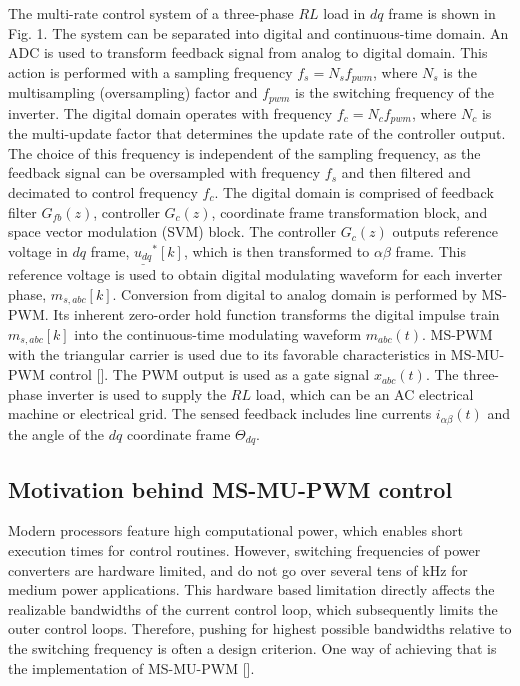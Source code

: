 \documentclass[journal]{IEEEtran}
\begin{document}
The multi-rate control system of a three-phase $RL$ load in $dq$ frame is shown in Fig. 1. The system can be separated into digital and continuous-time domain. An ADC is used to transform feedback signal from analog to digital domain. This action is performed with a sampling frequency $f_s = N_s f_{pwm}$, where $N_s$ is the multisampling (oversampling) factor and $f_{pwm}$ is the switching frequency of the inverter. The digital domain operates with frequency $f_c = N_c f_{pwm}$, where $N_c$ is the multi-update factor that determines the update rate of the controller output. The choice of this frequency is independent of the sampling frequency, as the feedback signal can be oversampled with frequency $f_s$ and then filtered and decimated to control frequency $f_c$. The digital domain is comprised of feedback filter $G_{fb}(z)$, controller $G_c(z)$, coordinate frame transformation block, and space vector modulation (SVM) block. The controller $G_c(z)$ outputs reference voltage in $dq$ frame, $\underline{u_{dq}}^*[k]$, which is then transformed to $\alpha \beta$ frame. This reference voltage is used to obtain digital modulating waveform for each inverter phase, $m_{s,abc}[k]$. Conversion from digital to analog domain is performed by MS-PWM. Its inherent zero-order hold function transforms the digital impulse train $m_{s,abc}[k]$ into the continuous-time modulating waveform $m_{abc}(t)$. MS-PWM with the triangular carrier is used due to its favorable characteristics in MS-MU-PWM control []. The PWM output is used as a gate signal $x_{abc}(t)$. The three-phase inverter is used to supply the $RL$ load, which can be an AC electrical machine or electrical grid. The sensed feedback includes line currents $i_{\alpha \beta}(t)$ and the angle of the $dq$ coordinate frame $\Theta_{dq}$. 

\subsection{Motivation behind MS-MU-PWM control}

Modern processors feature high computational power, which enables short execution times for control routines. However, switching frequencies of power converters are hardware limited, and do not go over several tens of kHz for medium power applications. This hardware based limitation directly affects the realizable bandwidths of the current control loop, which subsequently limits the outer control loops. Therefore, pushing for highest possible bandwidths relative to the switching frequency is often a design criterion. One way of achieving that is the implementation of MS-MU-PWM [].
\end{document}

